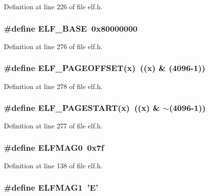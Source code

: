 Definition at line 226 of file elf.h.
\subsubsection[{ELF\_\-BASE}]{\setlength{\rightskip}{0pt plus 5cm}\#define ELF\_\-BASE~0x80000000}\label{elf_8h_f6804a39e256bb57546b96ccbbad4f22}




Definition at line 276 of file elf.h.
\subsubsection[{ELF\_\-PAGEOFFSET}]{\setlength{\rightskip}{0pt plus 5cm}\#define ELF\_\-PAGEOFFSET(x)~((x) \& (4096-1))}\label{elf_8h_cd8f0895fad3e335ba583326e6a96255}




Definition at line 278 of file elf.h.
\subsubsection[{ELF\_\-PAGESTART}]{\setlength{\rightskip}{0pt plus 5cm}\#define ELF\_\-PAGESTART(x)~((x) \& $\sim$(4096-1))}\label{elf_8h_536dd8bde9bf785a585a6e7ea7b8f614}




Definition at line 277 of file elf.h.
\subsubsection[{ELFMAG0}]{\setlength{\rightskip}{0pt plus 5cm}\#define ELFMAG0~0x7f}\label{elf_8h_2ae7ae1a6df04e0ed6be07b94590686e}




Definition at line 138 of file elf.h.
\subsubsection[{ELFMAG1}]{\setlength{\rightskip}{0pt plus 5cm}\#define ELFMAG1~'E'}\label{elf_8h_6237b3c20ffd799df7b9a91ab3bbdff4}




